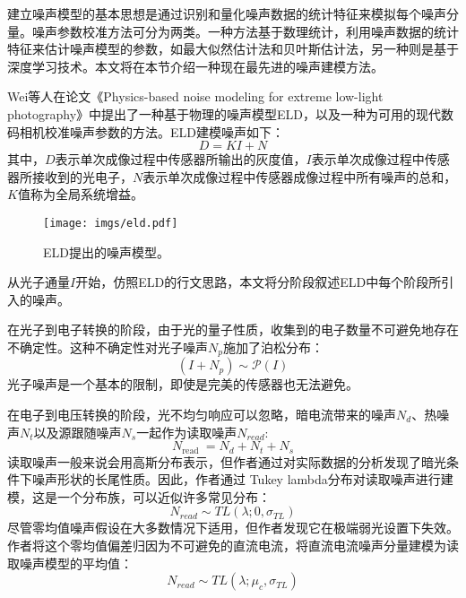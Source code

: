 建立噪声模型的基本思想是通过识别和量化噪声数据的统计特征来模拟每个噪声分量。噪声参数校准方法可分为两类。一种方法基于数理统计\cite{ccdcmos}，利用噪声数据的统计特征来估计噪声模型的参数，如最大似然估计法和贝叶斯估计法\cite{cmoscalibration,ccdcalibration}，另一种则是基于深度学习技术。本文将在本节介绍一种现在最先进的噪声建模方法。

Wei等人在论文《Physics-based noise modeling for extreme low-light photography》\cite{eld}中提出了一种基于物理的噪声模型ELD，以及一种为可用的现代数码相机校准噪声参数的方法。ELD建模噪声如下：
\begin{equation}
	D=K I+N
\end{equation}
其中，$D$表示单次成像过程中传感器所输出的灰度值，$I$表示单次成像过程中传感器所接收到的光电子，$N$表示单次成像过程中传感器成像过程中所有噪声的总和，$K$值称为全局系统增益。

\begin{figure}[h]
	\centering
	\texttt{[image: imgs/eld.pdf]}
	\caption{ELD提出的噪声模型。\cite{eld}}
	\label{fig:eld}
\end{figure}

从光子通量$I$开始，仿照ELD的行文思路，本文将分阶段叙述ELD中每个阶段所引入的噪声。

在光子到电子转换的阶段，由于光的量子性质，收集到的电子数量不可避免地存在不确定性。这种不确定性对光子噪声$N_p$施加了泊松分布：
\begin{equation}
	\left(I+N_p\right) \sim \mathcal{P}(I)
\end{equation}
光子噪声是一个基本的限制，即使是完美的传感器也无法避免。

在电子到电压转换的阶段，光不均匀响应可以忽略\cite{nonuniform}，暗电流带来的噪声$N_d$、热噪声$N_t$以及源跟随噪声$N_s$一起作为读取噪声$N_{read}$:
\begin{equation}
	N_{\text {read }}=N_d+N_t+N_s
\end{equation}
读取噪声一般来说会用高斯分布表示，但作者通过对实际数据的分析发现了暗光条件下噪声形状的长尾性质。因此，作者通过 Tukey lambda分布对读取噪声进行建模，这是一个分布族，可以近似许多常见分布：
\begin{equation}
	N_{read } \sim T L\left(\lambda ; 0, \sigma_{T L}\right)
\end{equation}
尽管零均值噪声假设在大多数情况下适用，但作者发现它在极端弱光设置下失效。作者将这个零均值偏差归因为不可避免的直流电流，将直流电流噪声分量建模为读取噪声模型的平均值：
\begin{equation}
	N_{read } \sim T L\left(\lambda ; \mu_c, \sigma_{T L}\right)
\end{equation}

